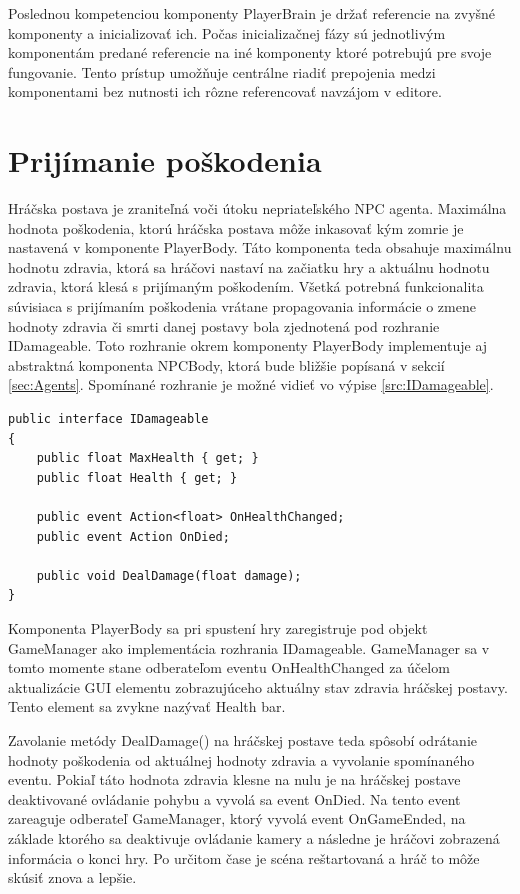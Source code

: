 \documentclass[slovak, master]{diploma}
\begin{document}
Poslednou kompetenciou komponenty PlayerBrain je držať referencie na zvyšné komponenty a inicializovať ich. Počas inicializačnej fázy sú jednotlivým komponentám predané referencie na iné komponenty ktoré potrebujú pre svoje fungovanie. Tento prístup umožňuje centrálne riadiť prepojenia medzi komponentami bez nutnosti ich rôzne referencovať navzájom v editore.

\section{Prijímanie poškodenia}
\label{sec:DealingDamage}
Hráčska postava je zraniteľná voči útoku nepriateľského NPC agenta. Maximálna hodnota poškodenia, ktorú hráčska postava môže inkasovať kým zomrie je nastavená v komponente PlayerBody. Táto komponenta teda obsahuje maximálnu hodnotu zdravia, ktorá sa hráčovi nastaví na začiatku hry a aktuálnu hodnotu zdravia, ktorá klesá s prijímaným poškodením. Všetká potrebná funkcionalita súvisiaca s prijímaním poškodenia vrátane propagovania informácie o zmene hodnoty zdravia či smrti danej postavy bola zjednotená pod rozhranie IDamageable. Toto rozhranie okrem komponenty PlayerBody implementuje aj abstraktná komponenta NPCBody, ktorá bude bližšie popísaná v sekcií \ref{sec:Agents}. Spomínané rozhranie je možné vidieť vo výpise \ref{src:IDamageable}. 

\vspace{8pt}
\begin{lstlisting}[label=src:IDamageable,caption={Rohranie IDamageable}]
public interface IDamageable
{
    public float MaxHealth { get; }
    public float Health { get; }

    public event Action<float> OnHealthChanged;
    public event Action OnDied;

    public void DealDamage(float damage);
}
\end{lstlisting}

Komponenta PlayerBody sa pri spustení hry zaregistruje pod objekt GameManager ako implementácia rozhrania IDamageable. GameManager sa v tomto momente stane odberateľom eventu OnHealthChanged za účelom aktualizácie GUI elementu zobrazujúceho aktuálny stav zdravia hráčskej postavy. Tento element sa zvykne nazývať Health bar.

Zavolanie metódy DealDamage() na hráčskej postave teda spôsobí odrátanie hodnoty poškodenia od aktuálnej hodnoty zdravia a vyvolanie spomínaného eventu. Pokiaľ táto hodnota zdravia klesne na nulu je na hráčskej postave deaktivované ovládanie pohybu a vyvolá sa event OnDied. Na tento event zareaguje odberateľ GameManager, ktorý vyvolá event OnGameEnded, na základe ktorého sa deaktivuje ovládanie kamery a následne je hráčovi zobrazená informácia o konci hry. Po určitom čase je scéna reštartovaná a hráč to môže skúsiť znova a lepšie. 
\end{document}
